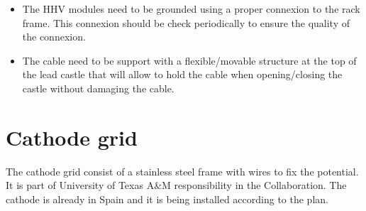 %


\begin{itemize}
\item The HHV modules need to be grounded using a proper connexion to the rack frame. This connexion should be check periodically to ensure the quality of the connexion.
\item The cable need to be support with a flexible/movable structure at the top  of the lead castle that will allow to hold the cable when opening/closing the castle without damaging the cable.
\end{itemize}

\section{Cathode grid}

The cathode grid consist of a stainless steel frame with wires to fix the potential. It is part of University of Texas A\&M responsibility in the Collaboration. The cathode is already in Spain and it is being installed according to the plan.

